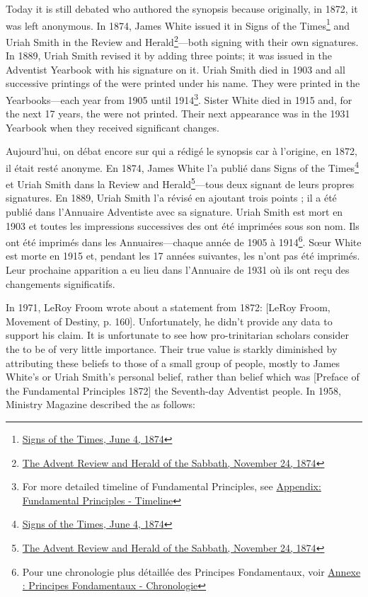 Today it is still debated who authored the synopsis because originally, in 1872, it was left anonymous. In 1874, James White issued it in Signs of the Times\footnote{\href{https://adventistdigitallibrary.org/adl-364148/signs-times-june-4-1874}{Signs of the Times, June 4, 1874}} and Uriah Smith in the Review and Herald\footnote{\href{http://documents.adventistarchives.org/Periodicals/RH/RH18741124-V44-22.pdf}{The Advent Review and Herald of the Sabbath, November 24, 1874}}—both signing with their own signatures. In 1889, Uriah Smith revised it by adding three points; it was issued in the Adventist Yearbook with his signature on it. Uriah Smith died in 1903 and all successive printings of the  were printed under his name. They were printed in the Yearbooks—each year from 1905 until 1914\footnote{For more detailed timeline of Fundamental Principles, see \hyperref[appendix:timeline]{Appendix: Fundamental Principles - Timeline}}. Sister White died in 1915 and, for the next 17 years, the  were not printed. Their next appearance was in the 1931 Yearbook when they received significant changes.


Aujourd'hui, on débat encore sur qui a rédigé le synopsis car à l'origine, en 1872, il était resté anonyme. En 1874, James White l'a publié dans Signs of the Times\footnote{\href{https://adventistdigitallibrary.org/adl-364148/signs-times-june-4-1874}{Signs of the Times, June 4, 1874}} et Uriah Smith dans la Review and Herald\footnote{\href{http://documents.adventistarchives.org/Periodicals/RH/RH18741124-V44-22.pdf}{The Advent Review and Herald of the Sabbath, November 24, 1874}}—tous deux signant de leurs propres signatures. En 1889, Uriah Smith l'a révisé en ajoutant trois points ; il a été publié dans l'Annuaire Adventiste avec sa signature. Uriah Smith est mort en 1903 et toutes les impressions successives des  ont été imprimées sous son nom. Ils ont été imprimés dans les Annuaires—chaque année de 1905 à 1914\footnote{Pour une chronologie plus détaillée des Principes Fondamentaux, voir \hyperref[appendix:timeline]{Annexe : Principes Fondamentaux - Chronologie}}. Sœur White est morte en 1915 et, pendant les 17 années suivantes, les  n'ont pas été imprimés. Leur prochaine apparition a eu lieu dans l'Annuaire de 1931 où ils ont reçu des changements significatifs.


In 1971, LeRoy Froom wrote about a statement from 1872: [LeRoy Froom, Movement of Destiny, p. 160]. Unfortunately, he didn’t provide any data to support his claim. It is unfortunate to see how pro-trinitarian scholars consider the  to be of very little importance. Their true value is starkly diminished by attributing these beliefs to those of a small group of people, mostly to James White’s or Uriah Smith’s personal belief, rather than belief which was [Preface of the Fundamental Principles 1872] the Seventh-day Adventist people. In 1958, Ministry Magazine described the  as follows:


